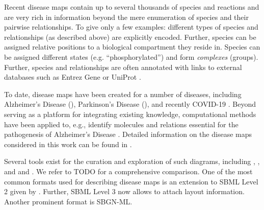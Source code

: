 \documentclass[
	fontsize=10pt, %
	twoside=false, %
	secnumdepth=1, %
]{kaobook}
\begin{document}
Recent disease maps contain up to several thousands of species and reactions and
are very rich in information beyond the mere enumeration of species and their
pairwise relationships. To give only a few examples: different types of species
and relationships (as described above) are explicitly encoded. Further, species
can be assigned relative positions to a biological compartment they reside in.
Species can be assigned different states (e.g. ``phosphorylated'') and form
\textit{complexes} (groups). Further, species and relationships are often
annotated with links to external databases such as Entrez Gene
\cite{maglott_EntrezGeneGenecentered_2005} or UniProt
\cite{theuniprotconsortium_UniProtUniversalProtein_2021}.



To date, disease maps have been created for a number of diseases, including Alzheimer's
Disease (\alzpathway \cite{ogishima_AlzPathwayUpdatedMap_2016}), Parkinson's Disease
(\pdmap \cite{fujita_IntegratingPathwaysParkinson_2014}), and recently \textsc{COVID-19}
\cite{ostaszewski_COVID19DiseaseMap_2020}. Beyond serving as a platform for
integrating existing knowledge, computational methods have been applied to,
e.g., identify molecules and relations essential for the pathogenesis of Alzheimer's
Disease \cite{mizuno_NetworkAnalysisComprehensive_2016}. Detailed information on
the disease maps considered in this work can be found in .

Several tools exist for the curation and exploration of such diagrams, including
 \cite{funahashi_CellDesignerVersatileModeling_2008},
 \cite{gawron_MINERVAPlatformVisualization_2016}, and
 \cite{shannon_cytoscape_2003} and 
\cite{rohn_VANTEDV2Framework_2012}. We refer to TODO for a comprehensive
comparison.
One of the most common formats used for describing disease maps is an extension to SBML
Level 2 given by . Further, SBML Level 3 now allows to attach
layout information. Another prominent format is SBGN-ML.
\end{document}
